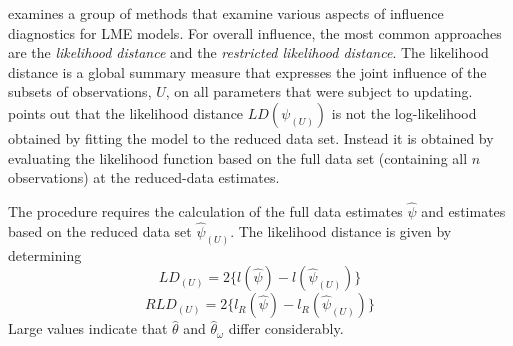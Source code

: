 \documentclass[12pt, a4paper]{report}
\theoremstyle{definition}
\theoremstyle{remark}
\begin{document}
\citet{west} examines a group of methods that examine various aspects of influence diagnostics for LME models. For overall influence, the most common approaches are the \textit{likelihood distance} and the \textit{restricted likelihood distance}.
The  likelihood distance is a global summary measure that expresses the joint influence of the subsets of observations, $U$, on all parameters that were subject to updating. \citet{schabenberger} points out that the likelihood distance $LD(\psi_{(U)})$ is not the log-likelihood obtained by fitting the model to the reduced data set. Instead it is obtained by evaluating the likelihood function based on the full data set (containing all $n$ observations) at the reduced-data estimates.





The
procedure requires the calculation of the full data estimates
$\hat{\psi}$ and estimates based on the reduced data set
$\hat{\psi}_{(U)}$. The likelihood distance is given by
determining
\[
LD_{(U)} = 2\{l(\hat{\psi}) - l( \hat{\psi}_{(U)}) \}\]\[
RLD_{(U)} = 2\{l_{R}(\hat{\psi}) - l_{R}(\hat{\psi}_{(U)})\}
\]
Large values indicate that ${\hat{\theta}}$ and ${\hat{\theta}_\omega}$ differ considerably.








\end{document}
